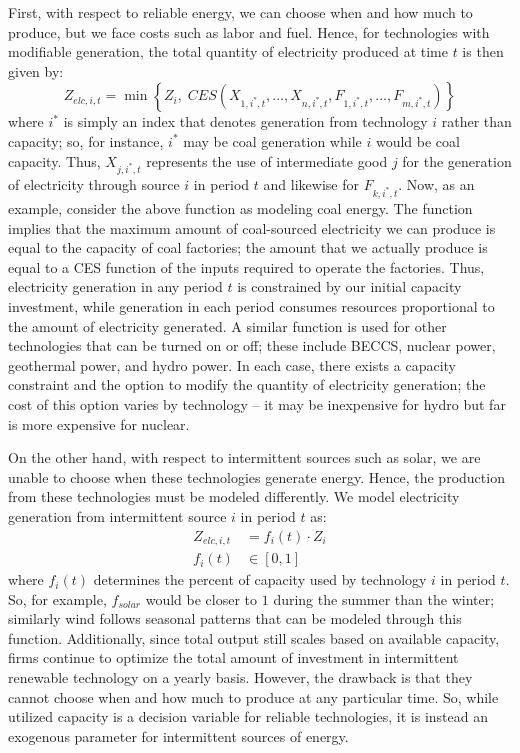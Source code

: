 \documentclass[12pt,a4paper]{extarticle}
\begin{document}
First, with respect to reliable energy, we can choose when and how much to produce, but we face costs such as labor and fuel. Hence, for technologies with modifiable generation, the total quantity of electricity produced at time $t$ is then given by:
$$ Z_{elc, i, t} = \min \left\{ Z_{i}, \; CES \left( X_{1,i^*,t}, \dots, X_{n,i^*,t}, F_{1,i^*,t}, \dots, F_{m,i^*,t} \right) \right\}$$
where $i^*$ is simply an index that denotes generation from technology $i$ rather than capacity; so, for instance, $i^*$ may be coal generation while $i$ would be coal capacity. Thus, $X_{j,i^*,t}$ represents the use of intermediate good $j$ for the generation of electricity through source $i$ in period $t$ and likewise for $F_{k,i^*,t}$. Now, as an example, consider the above function as modeling coal energy. The function implies that the maximum amount of coal-sourced electricity we can produce is equal to the capacity of coal factories; the amount that we actually produce is equal to a CES function of the inputs required to operate the factories. Thus, electricity generation in any period $t$ is constrained by our initial capacity investment, while generation in each period consumes resources proportional to the amount of electricity generated. A similar function is used for other technologies that can be turned on or off; these include BECCS, nuclear power, geothermal power, and hydro power. In each case, there exists a capacity constraint and the option to modify the quantity of electricity generation; the cost of this option varies by technology -- it may be inexpensive for hydro but far is more expensive for nuclear. 

On the other hand, with respect to intermittent sources such as solar, we are unable to choose when these technologies generate energy. Hence, the production from these technologies must be modeled differently. We model electricity generation from intermittent source $i$ in period $t$ as:
\begin{align*}
Z_{elc, i, t} &= f_i(t) \cdot Z_{i} \\
f_i(t) &\in [0,1]
\end{align*} 
where $f_i(t)$ determines the percent of capacity used by technology $i$ in period $t$. So, for example, $f_{solar}$ would be closer to $1$ during the summer than the winter; similarly wind follows seasonal patterns that can be modeled through this function. Additionally, since total output still scales based on available capacity, firms continue to optimize the total amount of investment in intermittent renewable technology on a yearly basis. However, the drawback is that they cannot choose when and how much to produce at any particular time. So, while utilized capacity is a decision variable for reliable technologies, it is instead an exogenous parameter for intermittent sources of energy. 
\end{document}
